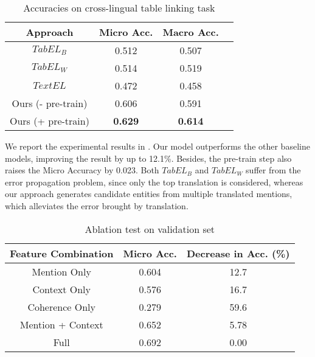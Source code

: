 \vspace*{-\baselineskip}
\begin{table}[ht]
	\small
	\centering
	\caption{Accuracies on cross-lingual table linking task}
	\label{tab:main-result}
	\begin{tabular} {c|c|cc}
		\hline
		Approach          & Micro Acc.   & Macro Acc.    \\
		\hline
		$TabEL_B$         &  0.512       & 0.507         \\
		$TabEL_W$         &  0.514       & 0.519         \\     %
		$TextEL$          &  0.472       & 0.458         \\
		\hline
		Ours (- pre-train) &  0.606    &  0.591        \\ 
		Ours (+ pre-train)  &  \textbf{0.629}       & \textbf{0.614}         \\
		\hline
	\end{tabular}
\end{table}


We report the experimental results in .
Our model outperforms the other baseline models, improving the result by up to 12.1\%.
Besides, the pre-train step also raises the Micro Accuracy by 0.023.
Both $TabEL_B$ and $TabEL_W$ suffer from the error propagation problem, %
since only the top translation is considered,
whereas our approach generates candidate entities from multiple translated mentions,
which alleviates the error brought by translation.

\vspace*{-\baselineskip}
\begin{table}[ht]
	\small
	\centering
	\caption{Ablation test on validation set}
	\label{tab:ablation-features}
	\begin{tabular} {c|c|c}
		\hline
		Feature Combination &   Micro Acc.  & Decrease in Acc. (\%) \\
		\hline
		Mention Only           &   0.604    & 12.7 \\
		Context Only        &   0.576    & 16.7   \\
		Coherence Only      &   0.279    & 59.6     \\
		Mention + Context      &   0.652    & 5.78    \\
		\hline
		Full                &   0.692    & 0.00  \\
		\hline
	\end{tabular}
\end{table}


